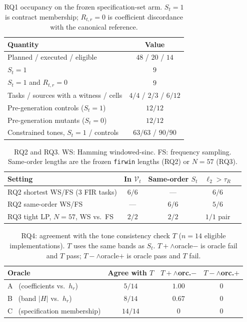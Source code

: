 \documentclass{article}
\begin{document}
\begin{table}[t]
\caption{RQ1 occupancy on the frozen specification-set arm.
$S_t=1$ is contract membership; $R_{t,r}=0$ is coefficient
discordance with the canonical reference.}
\label{tab:n}
\centering
\footnotesize
\setlength{\tabcolsep}{3.2pt}
\begin{tabular}{@{}lc@{}}
\hline
Quantity & Value \\
\hline
Planned / executed / eligible & $48$ / $20$ / $14$ \\
$S_t=1$ & $9$ \\
$S_t=1$ and $R_{t,r}=0$ & $9$ \\
Tasks / sources with a witness / cells & $4/4$ / $2/3$ / $6/12$ \\
Pre-generation controls ($S_t=1$) & $12/12$ \\
Pre-generation mutants ($S_t=0$) & $12/12$ \\
Constrained tones, $S_t=1$ / controls & $63/63$ / $90/90$ \\
\hline
\end{tabular}
\end{table}

\begin{table}[t]
\caption{RQ2 and RQ3.
WS: Hamming windowed-sinc.
FS: frequency sampling.
Same-order lengths are the frozen \texttt{firwin} lengths (RQ2) or
$N=57$ (RQ3).}
\label{tab:fp}
\centering
\footnotesize
\setlength{\tabcolsep}{2.6pt}
\begin{tabular}{@{}lcccc@{}}
\hline
Setting & In $\mathcal{V}_t$ & Same-order $S_t$ & $\ell_2>\tau_R$ \\
\hline
RQ2 shortest WS/FS (3 FIR tasks) & $6/6$ & --- & $6/6$ \\
RQ2 same-order WS/FS & --- & $6/6$ & $5/6$ \\
RQ3 tight LP, $N=57$, WS vs.\ FS & $2/2$ & $2/2$ & $1/1$ pair \\
\hline
\end{tabular}
\end{table}

\begin{table}[t]
\caption{RQ4: agreement with the tone consistency check $T$
($n=14$ eligible implementations).
$T$ uses the same bands as $S_t$.
$T{+}{\wedge}$oracle$-$ is oracle fail and $T$ pass;
$T{-}{\wedge}$oracle$+$ is oracle pass and $T$ fail.}
\label{tab:oracle}
\centering
\footnotesize
\setlength{\tabcolsep}{3.2pt}
\begin{tabular}{@{}lccc@{}}
\hline
Oracle & Agree with $T$ & $T{+}{\wedge}$orc.$-$ & $T{-}{\wedge}$orc.$+$ \\
\hline
A \ (coefficients vs.\ $h_r$) & $5/14$ & $1.00$ & $0$ \\
B \ (band $\lvert H\rvert$ vs.\ $h_r$) & $8/14$ & $0.67$ & $0$ \\
C \ (specification membership) & $14/14$ & $0$ & $0$ \\
\hline
\end{tabular}
\end{table}
\end{document}
